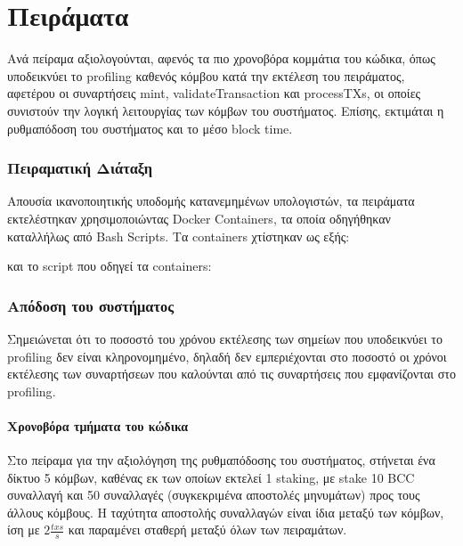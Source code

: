 \documentclass{article}
\newcommand{\eng}[1]{\foreignlanguage{english}{#1}} %
\begin{document}
\part{Πειράματα}

Ανά πείραμα αξιολογούνται, αφενός τα πιο χρονοβόρα κομμάτια του κώδικα, όπως
υποδεικνύει το \eng{profiling} καθενός κόμβου κατά την εκτέλεση του πειράματος,
αφετέρου οι συναρτήσεις \eng{mint}, \eng{validateTransaction} και
\eng{processTXs}, οι οποίες συνιστούν την λογική λειτουργίας των κόμβων του
συστήματος. Επίσης, εκτιμάται η ρυθμαπόδοση του συστήματος και το μέσο
\eng{block time}.

\section{Πειραματική Διάταξη}

Απουσία ικανοποιητικής υποδομής κατανεμημένων υπολογιστών, τα πειράματα εκτελέστηκαν
χρησιμοποιώντας \eng{Docker Containers}, τα οποία οδηγήθηκαν καταλλήλως από 
\eng{Bash Scripts}. Τα \eng{containers} χτίστηκαν ως εξής:



και το \eng{script} που οδηγεί τα \eng{containers}:





\section{Απόδοση του συστήματος}

Σημειώνεται ότι το ποσοστό του χρόνου εκτέλεσης των σημείων που υποδεικνύει το
\eng{profiling} δεν είναι κληρονομημένο, δηλαδή δεν εμπεριέχονται στο ποσοστό
οι χρόνοι εκτέλεσης των συναρτήσεων που καλούνται από τις συναρτήσεις που
εμφανίζονται στο \eng{profiling}.

\subsection{Χρονοβόρα τμήματα του κώδικα}

Στο πείραμα για την αξιολόγηση της ρυθμαπόδοσης του συστήματος, στήνεται ένα
δίκτυο 5 κόμβων, καθένας εκ των οποίων εκτελεί 1 \eng{staking}, με \eng{stake
10 BCC} συναλλαγή και 50 συναλλαγές (συγκεκριμένα αποστολές μηνυμάτων) προς
τους άλλους κόμβους. Η ταχύτητα αποστολής συναλλαγών είναι ίδια μεταξύ των
κόμβων, ίση με $2\frac{txs}{s}$ και παραμένει σταθερή μεταξύ όλων των
πειραμάτων.
\end{document}

